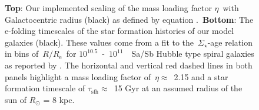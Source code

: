 \begin{figure}
\caption{\textbf{Top}: Our implemented scaling of the mass loading factor 
$\eta$~with Galactocentric radius (black) as defined by equation 
.~\textbf{Bottom}: The e-folding timescales of the star 
formation histories of our model galaxies (black). These values come from a 
fit to the~$\Sigma_\star$-age relation in bins of~$R/R_\text{e}$~for 
$10^{10.5}$~-~$10^{11}$~\msun~Sa/Sb Hubble type spiral galaxies as reported by 
\citet[][see discussion in~\S~\ref{migration:sec:methods:sfhs}]{Sanchez2020}. The 
horizontal and vertical red dashed lines in both panels highlight a mass 
loading factor of~$\eta \approx$~2.15 and a star formation timescale of 
$\tau_\text{sfh} \approx$~15 Gyr at an assumed radius of the sun of 
$R_\odot$ = 8 kpc. } 
\label{migration:fig:eta_tau_sfh} 
\end{figure} 

